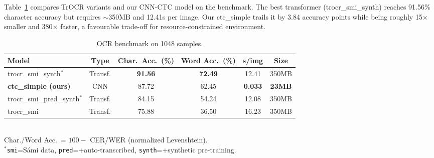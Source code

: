 \documentclass[runningheads]{llncs}
\newcommand{\ctcCacc}{87.72}
\newcommand{\trocrBestCacc}{91.56}
\newcommand{\modelSize}{23MB}
\newcommand{\benchmarkSamples}{1048}  %
\newcommand{\trocrSize}{350MB}
\newcommand{\trocrBestTime}{12.41}
\newcommand{\ctcTime}{0.033}
\newcommand{\speedupFactor}{380}
\newcommand{\sizeRatio}{15}
\newcommand{\cerAccGap}{3.84}
\newcommand{\trocrBestWordAcc}{72.49}
\newcommand{\ctcWordAcc}{62.45}
\newcommand{\trocrPredSynthCharAcc}{84.15}
\newcommand{\trocrPredSynthWordAcc}{54.24}
\newcommand{\trocrPredSynthTime}{12.08}
\newcommand{\trocrSmiCharAcc}{75.88}
\newcommand{\trocrSmiWordAcc}{36.50}
\newcommand{\trocrSmiTime}{16.23}
\begin{document}

\vspace{-0.3cm}
Table~\ref{tab:results} compares TrOCR variants and our CNN-CTC model on the benchmark. %
The best transformer (trocr\_smi\_synth) reaches \trocrBestCacc\% character accuracy but requires $\sim$\trocrSize{} and \trocrBestTime{}s per image. Our ctc\_simple trails it by \cerAccGap{} accuracy points while being roughly \sizeRatio$\times$ smaller and \speedupFactor$\times$ faster, a favourable trade-off for resource-constrained environment. 
\vspace{-0.5cm}

\vspace{-0.5cm}

\begin{table}[h]
\centering
\tiny

\caption{OCR benchmark on \benchmarkSamples{} samples.}
\label{tab:results}
\begin{tabular}{@{}lccccc@{}}
\toprule
Model & Type & Char.\ Acc.\ (\%) & Word Acc.\ (\%) & s/img & Size \\
\midrule
trocr\_smi\_synth$^*$ & Transf. & \textbf{\trocrBestCacc} & \textbf{\trocrBestWordAcc} & \trocrBestTime & \trocrSize \\
\textbf{ctc\_simple (ours)} & CNN & \ctcCacc & \ctcWordAcc & \textbf{\ctcTime} & \textbf{\modelSize} \\
trocr\_smi\_pred\_synth$^*$ & Transf. & \trocrPredSynthCharAcc & \trocrPredSynthWordAcc & \trocrPredSynthTime & \trocrSize \\
trocr\_smi & Transf. & \trocrSmiCharAcc & \trocrSmiWordAcc & \trocrSmiTime & \trocrSize \\
\bottomrule
\end{tabular}
\\[2pt]
Char./Word Acc.\ = $100 - $ CER/WER (normalized Levenshtein). \\
$^*$\texttt{smi}=S\'{a}mi data, \texttt{pred}=+auto-transcribed, \texttt{synth}=+synthetic pre-training.
\end{table}
\end{document}

